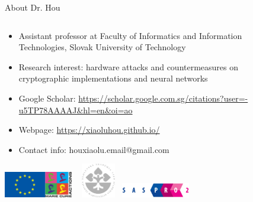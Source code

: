\documentclass[aspectratio=169]{beamer}
\begin{document}
\begin{frame}{About Dr. Hou}
\begin{columns}[T] %
\begin{column}{.7\textwidth}
\begin{itemize}
        \item Assistant professor at Faculty of Informatics and Information Technologies, Slovak University of Technology
        \item Research interest: hardware attacks and countermeasures on cryptographic implementations and neural networks
        \item Google Scholar: \url{https://scholar.google.com.sg/citations?user=-u5TP78AAAAJ&hl=en&oi=ao}
        \item Webpage: \url{https://xiaoluhou.github.io/}
        \item Contact info: houxiaolu.email@gmail.com
    \end{itemize}
\includegraphics[width=3cm]{fig/EU-flag-and-Marie-Curie-Logo.jpg} \hspace*{0.75cm}~%
\includegraphics[width=1.5cm]{fig/SAS_logo.png}\hspace*{0.75cm}~%
\includegraphics[width=3cm]{fig/saspro2_logo.png}
\end{column}%
\hfill%
\begin{column}{.5\textwidth}
\begin{figure}

\end{figure}
\end{column}
\end{columns}
\end{frame}
\end{document}
